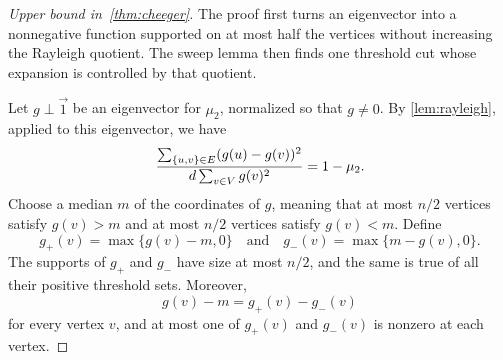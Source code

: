 \begin{proof}[Upper bound in~\cref{thm:cheeger}]
	The proof first turns an eigenvector into a nonnegative function supported on at most half the vertices without increasing the Rayleigh quotient. The sweep lemma then finds one threshold cut whose expansion is controlled by that quotient.

	Let \(g\perp\vec{1}\) be an eigenvector for \(\mu_2\), normalized so that \(g\neq 0\). By \cref{lem:rayleigh}, applied to this eigenvector, we have
	\begin{equation}
		\frac{\sum_{\{u,v\}\in E}(g(u)-g(v))^2}{d\sum_{v\in V}g(v)^2}=1-\mu_2.
	\end{equation}
	Choose a median \(m\) of the coordinates of \(g\), meaning that at most \(n/2\) vertices satisfy \(g(v)>m\) and at most \(n/2\) vertices satisfy \(g(v)<m\). Define
	\begin{equation}
		g_+(v)=\max\{g(v)-m,0\}
		\quad\text{and}\quad
		g_-(v)=\max\{m-g(v),0\}.
	\end{equation}
	The supports of \(g_+\) and \(g_-\) have size at most \(n/2\), and the same is true of all their positive threshold sets. Moreover,
	\begin{equation}
		g(v)-m=g_+(v)-g_-(v)
	\end{equation}
	for every vertex \(v\), and at most one of \(g_+(v)\) and \(g_-(v)\) is nonzero at each vertex.


\end{proof}
